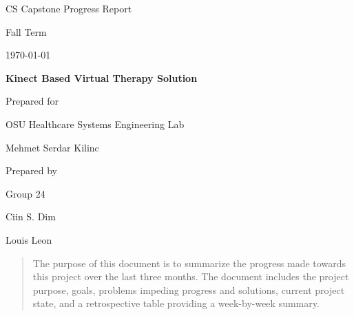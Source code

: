 \documentclass[onecolumn, draftclsnofoot,10pt, compsoc]{IEEEtran}
\def \CapstoneTeamName{     TeamName}
\def \CapstoneTeamNumber{       24}
\def \GroupMemberOne{            Ciin S. Dim}
\def \GroupMemberTwo{           Louis Leon}
\def \CapstoneProjectName{      Kinect Based Virtual Therapy Solution}
\def \CapstoneSponsorCompany{   OSU Healthcare Systems Engineering Lab}
\def \CapstoneSponsorPerson{        Mehmet Serdar Kilinc}
\def \DocType{      %
                Progress Report
                }
\newcommand{\NameSigPair}[1]{\par
\makebox[2.75in][r]{#1} \hfil   \makebox[3.25in]{\makebox[2.25in]{\hrulefill} \hfill        \makebox[.75in]{\hrulefill}}
\par\vspace{-12pt} \textit{\tiny\noindent
\makebox[2.75in]{} \hfil        \makebox[3.25in]{\makebox[2.25in][r]{Signature} \hfill  \makebox[.75in][r]{Date}}}}
\renewcommand{\NameSigPair}[1]{#1}
\begin{document}
\begin{titlepage}
    \begin{singlespace}
        \hfill 
        \par\vspace{.2in}
        \centering
        \scshape{
            \huge CS Capstone\DocType \par
            {\large Fall Term}\par
            {\large\today}\par
            \vspace{.5in}
            \textbf{\Huge\CapstoneProjectName}\par
            \vfill
            {\large Prepared for}\par
            \Huge \CapstoneSponsorCompany\par
            \vspace{5pt}
            {\Large\NameSigPair{\CapstoneSponsorPerson}\par}
            {\large Prepared by }\par
            Group\CapstoneTeamNumber\par
            \vspace{5pt}
            {\Large
                \NameSigPair{\GroupMemberOne}\par
                \NameSigPair{\GroupMemberTwo}\par
            }
            \vspace{20pt}
        }
        \begin{abstract}
        The purpose of this document is to summarize the progress made towards this project over the last three months. The document includes the project purpose, goals, problems impeding progress and solutions, current project state, and a retrospective table providing a week-by-week summary.
	\end{abstract}     
    \end{singlespace}
\end{titlepage}
\newpage
{}
\tableofcontents
\clearpage
\end{document}
